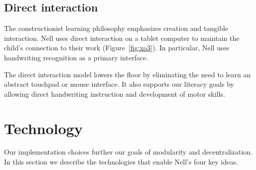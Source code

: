 \documentclass[preprint]{sig-alternate}
\begin{document}




\subsection{Direct interaction}


The constructionist learning philosophy emphasizes creation and
tangible interaction.  Nell uses direct interaction on a tablet
computer to maintain the child's connection to their work
(Figure~\ref{fig:xo3}).  In particular, Nell uses handwriting
recognition as a primary interface.

The direct interaction model lowers the floor by eliminating the need
to learn an abstract touchpad or mouse interface.  It also supports
our literacy goals by allowing direct handwriting instruction and
development of motor skills.

\section{Technology}

Our implementation choices further our goals of modularity and
decentralization.  In this
section we describe the technologies that enable Nell's four key ideas.
\end{document}
